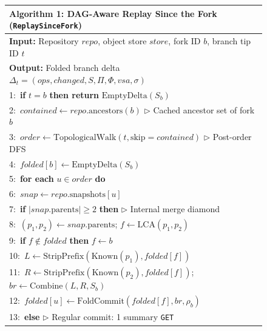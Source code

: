 \documentclass[sigconf, nonacm]{acmart}
\begin{document}
\begin{figure}[t]
\centering
\scriptsize
\begin{tabularx}{\columnwidth}{@{}X@{}}
\toprule
\textbf{Algorithm 1:} DAG-Aware Replay Since the Fork (\texttt{ReplaySinceFork}) \\
\midrule
\textbf{Input:} Repository $\mathit{repo}$, object store $\mathit{store}$, fork ID $b$, branch tip ID $t$ \\
\textbf{Output:} Folded branch delta $\Delta_t = (\mathit{ops}, \mathit{changed}, S, \Pi, \Phi, \mathit{vsa}, \sigma)$ \\
1:\ \textbf{if} $t = b$ \textbf{then return} $\text{EmptyDelta}(S_b)$ \\
2:\ $\mathit{contained} \gets \mathit{repo}.\text{ancestors}(b)$ \hfill $\triangleright$ Cached ancestor set of fork $b$ \\
3:\ $\mathit{order} \gets \text{TopologicalWalk}(t, \text{skip}=\mathit{contained})$ \hfill $\triangleright$ Post-order DFS \\
4:\ $\mathit{folded}[b] \gets \text{EmptyDelta}(S_b)$ \\
5:\ \textbf{for each} $u \in \mathit{order}$ \textbf{do} \\
6:\ \hspace{1em}$\mathit{snap} \gets \mathit{repo}.\text{snapshots}[u]$ \\
7:\ \hspace{1em}\textbf{if} $|\mathit{snap}.\text{parents}| \ge 2$ \textbf{then} \hfill $\triangleright$ Internal merge diamond \\
8:\ \hspace{2em}$(p_1, p_2) \gets \mathit{snap}.\text{parents}$;\; $f \gets \text{LCA}(p_1, p_2)$ \\
9:\ \hspace{2em}\textbf{if} $f \notin \mathit{folded}$ \textbf{then} $f \gets b$ \\
10:\ \hspace{1.65em}$L \gets \text{StripPrefix}(\text{Known}(p_1), \mathit{folded}[f])$ \\
11:\ \hspace{1.65em}$R \gets \text{StripPrefix}(\text{Known}(p_2), \mathit{folded}[f])$;\; $\mathit{br} \gets \text{Combine}(L, R, S_b)$ \\
12:\ \hspace{1.65em}$\mathit{folded}[u] \gets \text{FoldCommit}(\mathit{folded}[f], \mathit{br}, \rho_b)$ \\
13:\ \hspace{1em}\textbf{else} \hfill $\triangleright$ Regular commit: 1 summary \texttt{GET} \\

\end{tabularx}
\end{figure}
\end{document}
